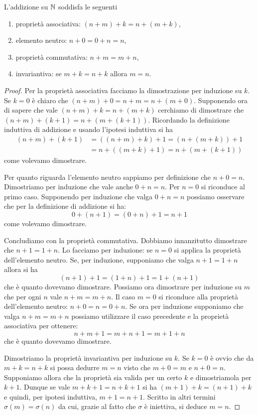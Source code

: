 \begin{theorem}
  L'addizione su $\mathbb N$ soddisfa le seguenti
  \begin{enumerate}
    \item proprietà associativa: $(n+m)+k = n + (m + k)$,
    \item elemento neutro: $n+0 = 0+n = n$,
    \item proprietà commutativa: $n+m = m+n$,
    \item invariantiva: se $m+k = n+k$ allora $m=n$.
  \end{enumerate}
\end{theorem}
\begin{proof}
Per la proprietà associativa facciamo la dimostrazione 
per induzione su $k$. 
Se $k=0$ è chiaro che $(n+m)+0 = n+m = n+(m+0)$.
Supponendo ora di sapere che vale $(n+m)+k = n+(m+k)$
cerchiamo di dimostrare che $(n+m)+(k+1) = n+(m+(k+1))$.
Ricordando la definizione induttiva di addizione e usando 
l'ipotesi induttiva si ha 
\begin{align*}
(n+m)+(k+1) 
 &= ((n+m)+k)+1 
 = (n+(m+k))+ 1\\
 &= n + ((m+k)+1)
 = n + (m+(k+1))
\end{align*}
come volevamo dimostrare.

Per quanto riguarda l'elemento neutro sappiamo per definizione 
che $n+0=n$. Dimostriamo per induzione che vale anche $0+n=n$.
Per $n=0$ si riconduce al primo caso.
Supponendo per induzione che valga $0+n=n$ possiamo osservare 
che per la definizione di addizione si ha:
\[
0 + (n+1) =  (0+n)+1 = n + 1
\]
come volevamo dimostrare.

Concludiamo con la proprietà commutativa.
Dobbiamo innanzitutto dimostrare che $n+1 = 1+n$.
Lo facciamo per induzione: se $n=0$ si applica la proprietà 
dell'elemento neutro.
Se, per induzione, supponiamo che valga $n+1=1+n$ allora 
si ha
\[
 (n+1) + 1 = (1+n) + 1 = 1+(n+1)
\]
che è quanto dovevamo dimostrare.
Possiamo ora dimostrare per 
induzione su $m$ che per ogni $n$ vale $n+m = m+n$.
Il caso $m=0$ si riconduce alla proprietà dell'elemento 
neutro: $n+0 = n = 0 + n$.
Se ora per induzione supponiamo che valga $n+m=m+n$ possiamo 
utilizzare il caso precedente e la proprietà associativa per ottenere:
\[
  n + m + 1 = m + n + 1 = m + 1 + n   
\]
che è quanto dovevamo dimostrare.

Dimostriamo la proprietà invariantiva per induzione su $k$.
Se $k=0$ è ovvio che da $m+k=n+k$ si possa dedurre $m=n$
visto che $m+0=m$ e $n+0=n$.
Supponiamo allora che la proprietà sia valida per un certo $k$
e dimostriamola per $k+1$.
Dunque se vale $m+k+1=n+k+1$ si ha $(m+1)+k=(n+1)+k$
e quindi, per ipotesi induttiva, $m+1 = n+1$.
Scritto in altri termini $\sigma(m)=\sigma(n)$ da cui,
grazie al fatto che $\sigma$ è iniettiva, si deduce $m=n$.
\end{proof}

